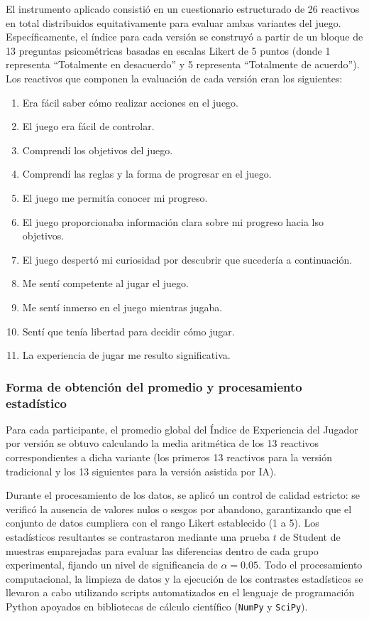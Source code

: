 El instrumento aplicado consistió en un cuestionario estructurado de 26 reactivos en total distribuidos equitativamente para evaluar ambas variantes del juego. Específicamente, el índice para cada versión se construyó a partir de un bloque de 13 preguntas psicométricas basadas en escalas Likert de 5 puntos (donde 1 representa ``Totalmente en desacuerdo'' y 5 representa ``Totalmente de acuerdo''). Los reactivos que componen la evaluación de cada versión eran los siguientes:
\begin{enumerate}
    \item Era fácil saber cómo realizar acciones en el juego.
    \item El juego era fácil de controlar.
    \item Comprendí los objetivos del juego.
    \item Comprendí las reglas y la forma de progresar en el juego.
    \item El juego me permitía conocer mi progreso.
    \item El juego proporcionaba información clara sobre mi progreso hacia lso objetivos.
    \item El juego despertó mi curiosidad por descubrir que sucedería a continuación.
    \item Me sentí competente al jugar el juego.
    \item Me sentí inmerso en el juego mientras jugaba.
    \item Sentí que tenía libertad para decidir cómo jugar.
    \item La experiencia de jugar me resulto significativa.
\end{enumerate}

\subsubsection{Forma de obtención del promedio y procesamiento estadístico} 
Para cada participante, el promedio global del Índice de Experiencia del Jugador por versión se obtuvo calculando la media aritmética de los 13 reactivos correspondientes a dicha variante (los primeros 13 reactivos para la versión tradicional y los 13 siguientes para la versión asistida por IA). 

Durante el procesamiento de los datos, se aplicó un control de calidad estricto: se verificó la ausencia de valores nulos o sesgos por abandono, garantizando que el conjunto de datos cumpliera con el rango Likert establecido (1 a 5). Los estadísticos resultantes se contrastaron mediante una prueba $t$ de Student de muestras emparejadas para evaluar las diferencias dentro de cada grupo experimental, fijando un nivel de significancia de $\alpha = 0.05$. Todo el procesamiento computacional, la limpieza de datos y la ejecución de los contrastes estadísticos se llevaron a cabo utilizando scripts automatizados en el lenguaje de programación Python apoyados en bibliotecas de cálculo científico (\texttt{NumPy} y \texttt{SciPy}).

